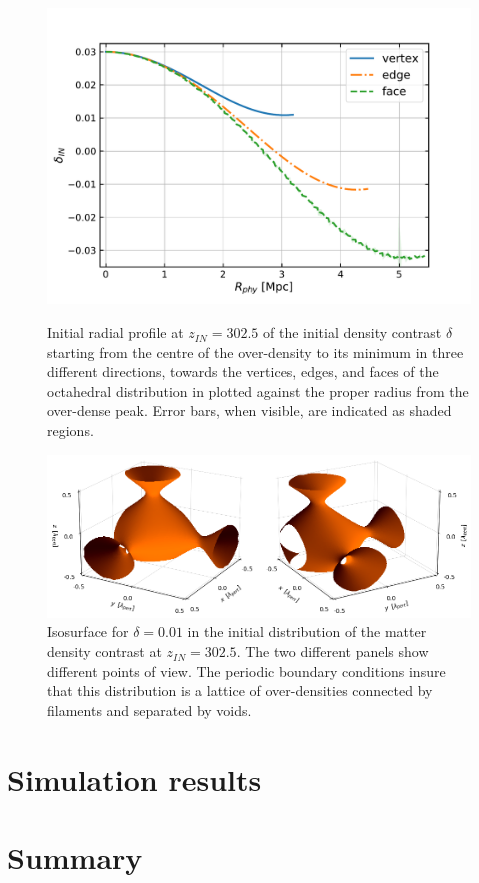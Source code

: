 \begin{figure}[th!]
\begin{minipage}{.49\textwidth}
        \includegraphics[width=\linewidth]{plots/Paper2/Initial_1d_delta.pdf}
        \caption[Radial profile of initial $\delta$]{Initial radial profile at $z_{IN} = 302.5$ of the initial density contrast $\delta$ starting from the centre of the over-density to its minimum in three different directions, towards the vertices, edges, and faces of the octahedral distribution in  plotted against the proper radius from the over-dense peak. Error bars, when visible, are indicated as shaded regions.}
        \label{fig: IniDelta1d}
    \end{minipage}
    \vspace{0.2cm}
    \begin{minipage}{\linewidth}
        \centering
        \includegraphics[width=\linewidth]{plots/Paper2/Initial_3d_delta_0d01_isocurve.png}
        \caption[Isosurface of initial $\delta$]{Isosurface for $\delta=0.01$ in the initial distribution of the matter density contrast at $z_{IN} = 302.5$. The two different panels show different points of view. The periodic boundary conditions insure that this distribution is a lattice of over-densities connected by filaments and separated by voids.}
        \label{fig: Isocurve}
    \end{minipage}
\end{figure}

\section{Simulation results} \label{sec: Sim: Results}

\section{Summary} \label{sec: Sim: Conclusion}

